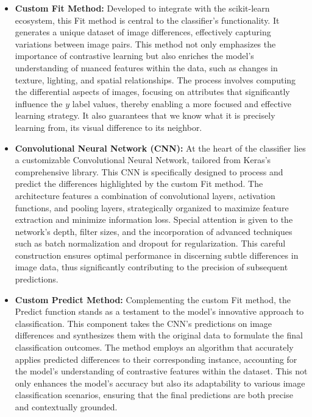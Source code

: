 \documentclass[a4paper, 12pt]{report}
\begin{document}
\begin{itemize}
    \item \textbf{Custom Fit Method:} Developed to integrate with the scikit-learn ecosystem, this Fit method is central to the classifier's functionality. 
    It generates a unique dataset of image differences, effectively capturing variations between image pairs. This method not only emphasizes the importance of contrastive learning but also enriches the model's understanding of nuanced features within the data, 
    such as changes in texture, lighting, and spatial relationships. The process involves computing the differential aspects of images, focusing on attributes that significantly influence the $y$ label values, thereby enabling a more focused and effective learning strategy.
    It also guarantees that we know what it is precisely learning from, its visual difference to its neighbor.

    \item \textbf{Convolutional Neural Network (CNN):} At the heart of the classifier lies a customizable Convolutional Neural Network, tailored from Keras's comprehensive library. 
    This CNN is specifically designed to process and predict the differences highlighted by the custom Fit method. The architecture features a combination of convolutional layers, activation functions, 
    and pooling layers, strategically organized to maximize feature extraction and minimize information loss. Special attention is given to the network's depth, filter sizes, 
    and the incorporation of advanced techniques such as batch normalization and dropout for regularization. 
    This careful construction ensures optimal performance in discerning subtle differences in image data, thus significantly contributing to the precision of subsequent predictions.
    
    \item \textbf{Custom Predict Method:} Complementing the custom Fit method, 
    the Predict function stands as a testament to the model's innovative approach to classification. 
    This component takes the CNN's predictions on image differences and synthesizes them with the original data to formulate the final classification outcomes. 
    The method employs an algorithm that accurately applies predicted differences to their corresponding instance, accounting for the model's understanding of contrastive features within the dataset. 
    This not only enhances the model's accuracy but also its adaptability to various image classification scenarios, ensuring that the final predictions are both precise and contextually grounded.
\end{itemize}
\end{document}
